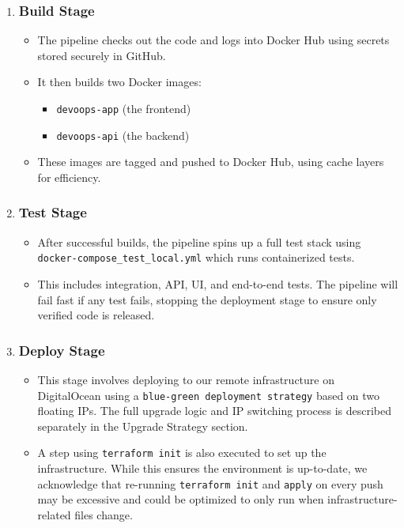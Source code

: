 \begin{enumerate}
\item
\subsubsection*{Build Stage}
\begin{itemize}
  \item The pipeline checks out the code and logs into Docker Hub using secrets stored securely in GitHub.
  \item It then builds two Docker images:
    \begin{itemize}
      \item \texttt{devoops-app} (the frontend)
      \item \texttt{devoops-api} (the backend)
    \end{itemize}
  \item These images are tagged and pushed to Docker Hub, using cache layers for efficiency.
\end{itemize}

\item
\subsubsection*{Test Stage}
\begin{itemize}
  \item After successful builds, the pipeline spins up a full test stack using 
  \texttt{docker-compose\_test\_local.yml} which runs containerized tests.
  \item This includes integration, API, UI, and end-to-end tests. The pipeline will fail fast if any test fails, stopping the deployment stage to ensure only verified code is released.
\end{itemize}

\item
\subsubsection*{Deploy Stage}
\begin{itemize}
  \item This stage involves deploying to our remote infrastructure on DigitalOcean using a \texttt{blue-green deployment strategy} based on two floating IPs. The full upgrade logic and IP switching process is described separately in the Upgrade Strategy section.
  \item A step using \texttt{terraform init} is also executed to set up the infrastructure. While this ensures the environment is up-to-date, we acknowledge that re-running \texttt{terraform init} and \texttt{apply} on every push may be excessive and could be optimized to only run when infrastructure-related files change.
\end{itemize}
\end{enumerate}

